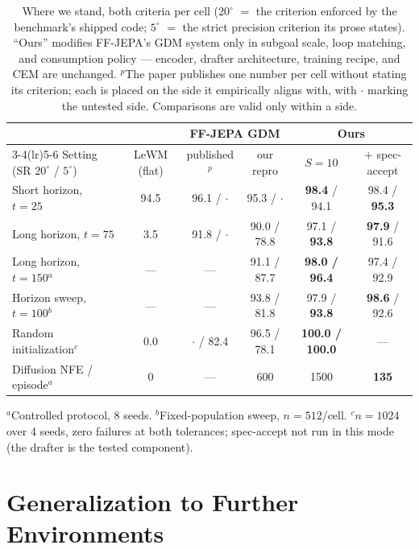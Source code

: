 \documentclass{article}
\newcommand{\ours}[1]{\textbf{#1}}          %
\newcommand{\degc}[1]{$#1^\circ$}
\begin{document}
\begin{table}[h]
\centering
\small
\setlength{\tabcolsep}{5pt}
\caption{Where we stand, both criteria per cell (\degc{20} $=$ the criterion enforced by
the benchmark's shipped code; \degc{5} $=$ the strict precision criterion its prose
states). ``Ours'' modifies FF-JEPA's GDM system only in subgoal scale, loop matching, and
consumption policy --- encoder, drafter architecture, training recipe, and CEM are
unchanged. $^{p}$The paper publishes one number per cell without stating its criterion;
each is placed on the side it empirically aligns with, with $\cdot$ marking the untested
side. Comparisons are valid only within a side.}
\label{tab:headline}
\begin{tabular}{lccccc}
\toprule
& & \multicolumn{2}{c}{FF-JEPA GDM} & \multicolumn{2}{c}{\ours{Ours}} \\
\cmidrule(lr){3-4}\cmidrule(lr){5-6}
Setting (SR \degc{20} / \degc{5}) & LeWM (flat) & published$^{p}$ & our repro & $S{=}10$ & $+$ spec-accept \\
\midrule
Short horizon, $t{=}25$          & 94.5 & 96.1 / $\cdot$ & 95.3 / $\cdot$ & \ours{98.4} / 94.1 & 98.4 / \ours{95.3} \\
Long horizon, $t{=}75$           & 3.5  & 91.8 / $\cdot$ & 90.0 / 78.8 & 97.1 / \ours{93.8} & \ours{97.9} / 91.6 \\
Long horizon, $t{=}150$$^{a}$    & ---  & --- & 91.1 / 87.7 & \ours{98.0 / 96.4} & 97.4 / 92.9 \\
Horizon sweep, $t{=}100$$^{b}$   & ---  & --- & 93.8 / 81.8 & 97.9 / \ours{93.8} & \ours{98.6} / 92.6 \\
Random initialization$^{c}$      & 0.0  & $\cdot$ / 82.4 & 96.5 / 78.1 & \ours{100.0 / 100.0} & --- \\
\midrule
Diffusion NFE / episode$^{a}$    & 0    & --- & 600 & 1500 & \ours{135} \\
\bottomrule
\end{tabular}

\vspace{1mm}
{\footnotesize $^{a}$Controlled protocol, 8 seeds. $^{b}$Fixed-population sweep,
$n{=}512$/cell. $^{c}$$n{=}1024$ over 4 seeds, zero failures at both tolerances;
spec-accept not run in this mode (the drafter is the tested component).}
\end{table}

\section{Generalization to Further Environments}
\label{sec:generalize}
\end{document}
